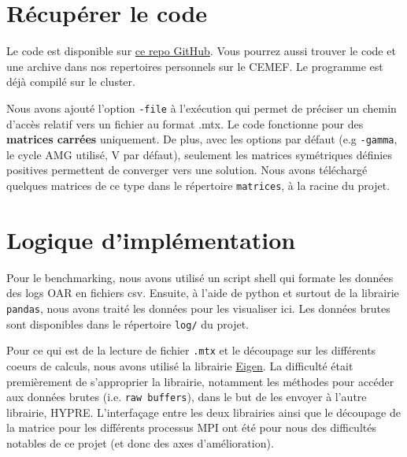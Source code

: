\documentclass[10pt,twocolumn,letterpaper]{article}
\def\code#1{\texttt{#1}}
\begin{document}
\section{Récupérer le code}
Le code est disponible sur
\href{https://github.com/Aympab/HypreBoomerAMG_Benchmark}{ce repo GitHub}.
Vous pourrez aussi trouver le code et une archive dans nos repertoires
personnels sur le CEMEF. Le programme est déjà compilé sur le cluster.

Nous avons ajouté l'option \code{-file} à l'exécution qui permet de préciser
un chemin d'accès relatif vers un fichier au format .mtx. Le code fonctionne
pour des \textbf{matrices carrées} uniquement. De plus, avec les options par 
défaut (e.g \code{-gamma}, le cycle AMG utilisé, V par défaut), seulement les
matrices symétriques définies positives permettent de converger vers une
solution. Nous avons téléchargé quelques matrices de ce type dans le répertoire
\code{matrices}, à la racine du projet.

\section{Logique d'implémentation}

Pour le benchmarking, nous avons utilisé un script shell qui formate les données
des logs OAR en fichiers csv.
Ensuite, à l'aide de python et surtout de la librairie \code{pandas}, nous avons
traité les données pour les visualiser ici.
Les données brutes sont disponibles dans le répertoire \code{log/} du projet.

Pour ce qui est de la lecture de fichier \code{.mtx} et le découpage sur les
différents coeurs de calculs, nous avons utilisé la librairie
\href{https://eigen.tuxfamily.org/index.php?title=Main_Page}{Eigen}.
La difficulté était premièrement de s'approprier la librairie, notamment les
méthodes pour accéder aux données brutes (i.e. \code{raw buffers}), dans le but
de les envoyer à l'autre librairie, HYPRE. L'interfaçage entre les deux
librairies ainsi que le découpage de la matrice pour les différents processus
MPI ont été pour nous des difficultés notables de ce projet (et donc des axes
d'amélioration).
\end{document}
